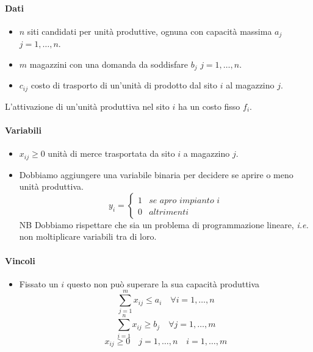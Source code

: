 \documentclass[12pt, letterpaper]{article}
\begin{document}
				\begin{dati}
					\paragraph{Dati}
						\begin{itemize}
							\item $n$ siti candidati per unità produttive, ognuna con capacità massima $a_j$ $j=1, \dots, n$.
							\item $m$ magazzini con una domanda da soddisfare $b_j$ $j=1, \dots, n$.
							\item $c_{ij}$ costo di trasporto di un'unità di prodotto dal sito $i$ al magazzino $j$.
						\end{itemize}
						L'attivazione di un'unità produttiva nel sito $i$ ha un costo fisso $f_i$.
				\end{dati}
					
				\begin{variabili}
					\paragraph{Variabili}
						\begin{itemize}
							\item $x_{ij} \geq 0$ unità di merce trasportata da sito $i$ a magazzino $j$.
							\item Dobbiamo aggiungere una variabile binaria per decidere se aprire o meno unità produttiva.
								$$y_i = 
								\begin{cases} 
									1 & \textit{se apro impianto i}\\
									0 & altrimenti
								\end{cases}
								$$
								\textsc{NB} Dobbiamo rispettare che sia un problema di programmazione lineare, \textit{i.e.} non moltiplicare variabili tra di loro.
						\end{itemize}
				\end{variabili}
				
				\begin{vincoli}
					\paragraph{Vincoli}
						\begin{itemize}
							\item Fissato un $i$ questo non può superare la sua capacità produttiva
								$$\sum_{j=1}^m x_{ij} \leq a_i \quad \forall i=1, \dots, n$$
								$$\sum_{i=1}^n x_{ij} \geq b_j \quad \forall j=1, \dots, m$$
								$$x_{ij} \geq 0 \quad j=1, \dots, n \quad i=1, \dots, m$$
								
							
						\end{itemize}
				\end{vincoli}				
				
\end{document}

